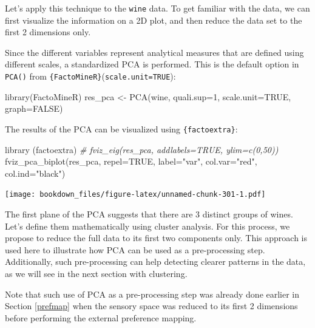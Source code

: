 \documentclass[
]{krantz}
\makeatletter
\newenvironment{Shaded}{\begin{snugshade}}{\end{snugshade}}
\newcommand{\AttributeTok}[1]{\textcolor[rgb]{0.61,0.61,0.61}{#1}}
\newcommand{\CommentTok}[1]{\textcolor[rgb]{0.37,0.37,0.37}{\textit{#1}}}
\newcommand{\ConstantTok}[1]{\textcolor[rgb]{0,0,0}{#1}}
\newcommand{\DecValTok}[1]{\textcolor[rgb]{0.06,0.06,0.06}{#1}}
\newcommand{\FunctionTok}[1]{\textcolor[rgb]{0,0,0}{#1}}
\newcommand{\NormalTok}[1]{#1}
\newcommand{\OtherTok}[1]{\textcolor[rgb]{0.37,0.37,0.37}{#1}}
\newcommand{\StringTok}[1]{\textcolor[rgb]{0.5,0.5,0.5}{#1}}
\renewenvironment{quote}{\begin{VF}}{\end{VF}}
\newenvironment{kframe}{%
\medskip{}
\setlength{\fboxsep}{.8em}
 \def\at@end@of@kframe{}%
 \ifinner\ifhmode%
  \def\at@end@of@kframe{\end{minipage}}%
  \begin{minipage}{\columnwidth}%
 \fi\fi%
 \def\FrameCommand##1{\hskip\@totalleftmargin \hskip-\fboxsep
 \colorbox{shadecolor}{##1}\hskip-\fboxsep
     \hskip-\linewidth \hskip-\@totalleftmargin \hskip\columnwidth}%
 \MakeFramed {\advance\hsize-\width
   \@totalleftmargin\z@ \linewidth\hsize
   \@setminipage}}%
 {\par\unskip\endMakeFramed%
 \at@end@of@kframe}
\renewenvironment{Shaded}{\begin{kframe}}{\end{kframe}}
\makeatother
\begin{document}
Let's apply this technique to the \texttt{wine} data. To get familiar with the data, we can first visualize the information on a 2D plot, and then reduce the data set to the first 2 dimensions only.

Since the different variables represent analytical measures that are defined using different scales, a standardized PCA is performed. This is the default option in \texttt{PCA()} from \texttt{\{FactoMineR\}}(\texttt{scale.unit=TRUE}):

\begin{Shaded}
\begin{Highlighting}[]
\FunctionTok{library}\NormalTok{(FactoMineR)}
\NormalTok{res\_pca }\OtherTok{\textless{}{-}} \FunctionTok{PCA}\NormalTok{(wine, }\AttributeTok{quali.sup=}\DecValTok{1}\NormalTok{, }\AttributeTok{scale.unit=}\ConstantTok{TRUE}\NormalTok{, }\AttributeTok{graph=}\ConstantTok{FALSE}\NormalTok{)}
\end{Highlighting}
\end{Shaded}

The results of the PCA can be visualized using \texttt{\{factoextra\}}:

\begin{Shaded}
\begin{Highlighting}[]
\FunctionTok{library}\NormalTok{ (factoextra)}
\CommentTok{\# fviz\_eig(res\_pca, addlabels=TRUE, ylim=c(0,50))}
\FunctionTok{fviz\_pca\_biplot}\NormalTok{(res\_pca, }\AttributeTok{repel=}\ConstantTok{TRUE}\NormalTok{, }\AttributeTok{label=}\StringTok{"var"}\NormalTok{, }
                \AttributeTok{col.var=}\StringTok{"red"}\NormalTok{, }\AttributeTok{col.ind=}\StringTok{"black"}\NormalTok{)}
\end{Highlighting}
\end{Shaded}

\texttt{[image: bookdown\_files/figure-latex/unnamed-chunk-301-1.pdf]}

The first plane of the PCA suggests that there are 3 distinct groups of wines. Let's define them mathematically using cluster analysis. For this process, we propose to reduce the full data to its first two components only. This approach is used here to illustrate how PCA can be used as a pre-processing step. Additionally, such pre-processing can help detecting clearer patterns in the data, as we will see in the next section with clustering.

\begin{quote}
Note that such use of PCA as a pre-processing step was already done earlier in Section \ref{prefmap} when the sensory space was reduced to its first 2 dimensions before performing the external preference mapping.
\end{quote}
\end{document}
